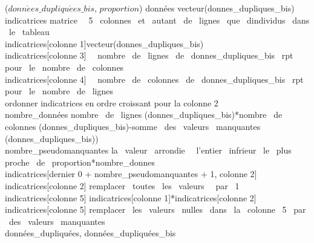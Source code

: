 \documentclass[12pt, openany, fleqn, french]{article}
\begin{document}
\begin{algorithm}[H]
\footnotesize
{} {($donn\acute{e}es\_dupliqu\acute{e}es\_bis$, $proportion$)}
    \State données \gets vecteur(donnes\_dupliques\_bis)\\
    \State indicatrices \gets matrice \,  \, 5 \, colonnes \, et \, autant \, de \, lignes \, que \, d\textquotesingle individus \, dans \, le \, tableau \\
    \State indicatrices[colonne 1]\gets vecteur(donnes\_dupliques\_bis)\\
    \Pour{la longueur du vecteur données}{
    \State \Si{données(ligne) est une valeur manquante} {indicatrices[ligne, colonne 2] \gets 0\\} \Sinon {indicatrices[ligne, colonne 2] \gets tirage \, uniforme \, sur \, ]1,2[\\}\\}
    \State indicatrices[colonne 3]  \,  \, nombre \, de \, lignes \, de \, donnes\_dupliques\_bis \, rpt \, pour \, le \, nombre \, de \, colonnes \\
    \State indicatrices[colonne 4]  \,  \, nombre \, de \, colonnes \, de \, donnes\_dupliques\_bis \, rpt \, pour \, le \, nombre \, de \, lignes \\
    \State ordonner indicatrices en ordre croissant pour la colonne 2\\
    \State nombre\_données \gets nombre \, de \, lignes (donnes\_dupliques\_bis)*nombre \, de \, colonnes (donnes\_dupliques\_bis)-somme \, des \, valeurs \, manquantes (donnes\_dupliques\_bis))\\
    \State nombre\_pseudomanquantes \gets la \, valeur \, arrondie \,  \, l'entier \, infrieur \, le \, plus \, proche \, de \, proportion*nombre\_donnes\\
    \State indicatrices[dernier 0 + nombre\_pseudomanquantes + 1, colonne 2]  \\
    \State indicatrices[colonne 2] \gets remplacer \, toutes \, les \, valeurs \, \, par \, 1\\
    \State indicatrices[colonne 5] \gets indicatrices[colonne 1]*indicatrices[colonne 2]\\
    \State indicatrices[colonne 5] \gets remplacer \, les \, valeurs \, nulles \, dans \, la \, colonne \, 5 \, par \, des \, valeurs \, manquantes\\
    \State {}
    \newpage
    \State \Return données\_dupliquées, données\_dupliquées\_bis\\
    \EndFunction


\end{algorithm}
\end{document}
